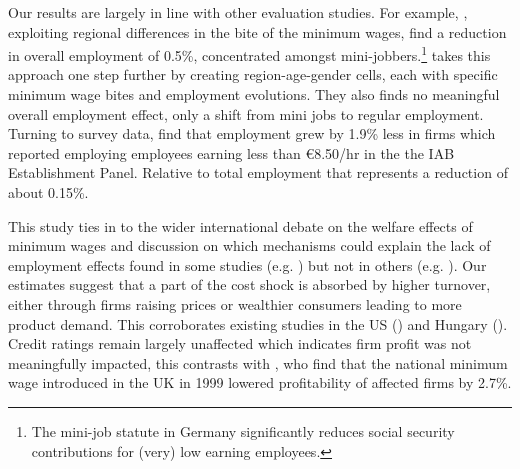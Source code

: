 Our results are largely in line with other evaluation studies. For example, \citet{Caliendo2018le}, exploiting regional differences in the bite of the minimum wages, find a reduction in overall employment of 0.5\%, concentrated amongst mini-jobbers.\footnote{The mini-job statute in Germany significantly reduces social security contributions for (very) low earning employees.} \citet{Garloff2016} takes this approach one step further by creating region-age-gender cells, each with specific minimum wage bites and employment evolutions. They also finds no meaningful overall employment effect, only a shift from mini jobs to regular employment. Turning to survey data, \citet{Bossler2016} find that employment grew by 1.9\% less in firms which reported employing employees earning less than €8.50/hr in the the IAB Establishment Panel. Relative to total employment that represents a reduction of about 0.15\%.

This study ties in to the wider international debate on the welfare effects of minimum wages and discussion on which mechanisms could explain the lack of employment effects found in some studies (e.g. \citet{Cengiz2018, Allegretto2013, Dube2016a}) but not in others (e.g. \citet{Neumark1992, Liu2016, Neumark2014a}). Our estimates suggest that a part of the cost shock is absorbed by higher turnover, either through firms raising prices or wealthier consumers leading to more product demand. This corroborates existing studies in the US (\citet{Aaronson2001, Allegretto2018}) and Hungary (\citet{Cengiz2018}). Credit ratings remain largely unaffected which indicates firm profit was not meaningfully impacted, this contrasts with \citet{Draca2011}, who find that the national minimum wage introduced in the UK in 1999 lowered profitability of affected firms by 2.7\%. %
